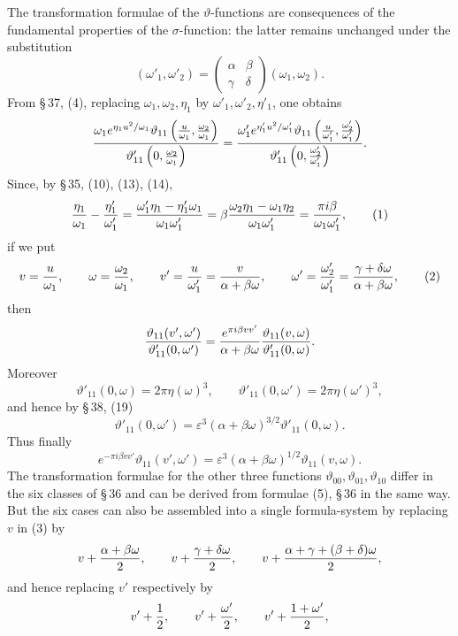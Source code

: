\documentclass[11pt]{article}
\providecommand{\tht}{\vartheta}
\begin{document}
The transformation formulae of the $\vartheta$-functions are consequences of the fundamental properties of the $\sigma$-function: the latter remains unchanged under the substitution
\[
(\omega'_1,\omega'_2)=
\begin{pmatrix}\alpha&\beta\\ \gamma&\delta\end{pmatrix}(\omega_1,\omega_2).
\]
From \S\,37, (4), replacing $\omega_1,\omega_2,\eta_1$ by $\omega'_1,\omega'_2,\eta'_1$, one obtains
\[
{\omega_1 e^{\eta_1u^2/\omega_1}\tht_{11}\left({u\over\omega_1},{\omega_2\over\omega_1}\right)
\over \tht'_{11}\left(0,{\omega_2\over\omega_1}\right)}
=
{\omega'_1 e^{\eta'_1u^2/\omega'_1}\tht_{11}\left({u\over\omega'_1},{\omega'_2\over\omega'_1}\right)
\over \tht'_{11}\left(0,{\omega'_2\over\omega'_1}\right)}.
\]
Since, by \S\,35, (10), (13), (14),
\begin{equation}
{\eta_1\over\omega_1}-{\eta'_1\over\omega'_1}
={\omega'_1\eta_1-\eta'_1\omega_1\over\omega_1\omega'_1}
=\beta{\omega_2\eta_1-\omega_1\eta_2\over\omega_1\omega'_1}
={\pi i\beta\over\omega_1\omega'_1},
\tag{1}
\end{equation}
if we put
\begin{equation}
 v={u\over\omega_1},
\qquad
\omega={\omega_2\over\omega_1},
\qquad
v'={u\over\omega'_1}={v\over\alpha+
\beta\omega},
\qquad
\omega'={\omega'_2\over\omega'_1}={\gamma+\delta\omega\over\alpha+
\beta\omega},
\tag{2}
\end{equation}
then
\[
{\tht_{11}(v',\omega')\over\tht'_{11}(0,\omega')}
={e^{\pi i\beta vv'}
\over\alpha+
\beta\omega}
{\tht_{11}(v,\omega)\over\tht'_{11}(0,\omega)}.
\]
Moreover
\[
\tht'_{11}(0,\omega)=2\pi\eta(\omega)^3,
\qquad
\tht'_{11}(0,\omega')=2\pi\eta(\omega')^3,
\]
and hence by \S\,38, (19)
\[
\tht'_{11}(0,\omega')=\varepsilon^3(\alpha+
\beta\omega)^{3/2}\tht'_{11}(0,
\omega).
\]
Thus finally
\begin{equation}
e^{-\pi i\beta vv'}\tht_{11}(v',\omega')=\varepsilon^3(\alpha+
\beta\omega)^{1/2}\tht_{11}(v,
\omega). 
\tag{3}
\end{equation}
The transformation formulae for the other three functions $\tht_{00},\tht_{01},\tht_{10}$ differ in the six classes of \S\,36 and can be derived from formulae (5), \S\,36 in the same way. But the six cases can also be assembled into a single formula-system by replacing $v$ in (3) by
\[
v+{\alpha+
\beta\omega\over2},
\qquad
v+{\gamma+\delta\omega\over2},
\qquad
v+{\alpha+
\gamma+(
\beta+
\delta)\omega\over2},
\]
and hence replacing $v'$ respectively by
\[
v'+{1\over2},
\qquad v'+{\omega'\over2},
\qquad v'+{1+
\omega'\over2},
\]
\end{document}
